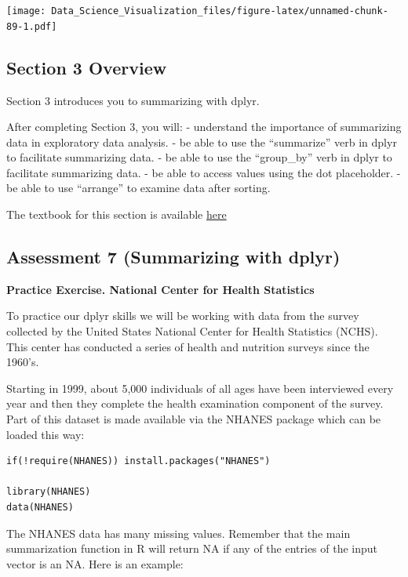 \documentclass[
]{article}
\begin{document}
\texttt{[image: Data\_Science\_Visualization\_files/figure-latex/unnamed-chunk-89-1.pdf]}

\hypertarget{section-3-overview}{%
\subsection{Section 3 Overview}\label{section-3-overview}}

Section 3 introduces you to summarizing with dplyr.

After completing Section 3, you will: - understand the importance of
summarizing data in exploratory data analysis. - be able to use the
``summarize'' verb in dplyr to facilitate summarizing data. - be able to
use the ``group\_by'' verb in dplyr to facilitate summarizing data. - be
able to access values using the dot placeholder. - be able to use
``arrange'' to examine data after sorting.

The textbook for this section is available
\href{https://rafalab.github.io/dsbook/tidyverse.html\#tidy-data}{here}

\hypertarget{assessment-7-summarizing-with-dplyr}{%
\subsection{Assessment 7 (Summarizing with
dplyr)}\label{assessment-7-summarizing-with-dplyr}}

\textbf{Practice Exercise. National Center for Health Statistics}

To practice our dplyr skills we will be working with data from the
survey collected by the United States National Center for Health
Statistics (NCHS). This center has conducted a series of health and
nutrition surveys since the 1960's.

Starting in 1999, about 5,000 individuals of all ages have been
interviewed every year and then they complete the health examination
component of the survey. Part of this dataset is made available via the
NHANES package which can be loaded this way:

\begin{verbatim}
if(!require(NHANES)) install.packages("NHANES")

library(NHANES)
data(NHANES)
\end{verbatim}

The NHANES data has many missing values. Remember that the main
summarization function in R will return NA if any of the entries of the
input vector is an NA. Here is an example:
\end{document}
